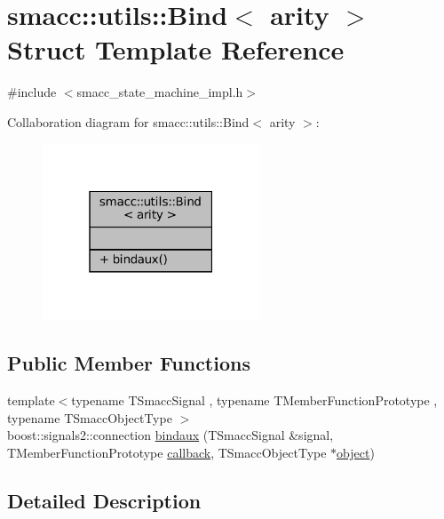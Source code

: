 \hypertarget{structsmacc_1_1utils_1_1Bind}{}\section{smacc\+:\+:utils\+:\+:Bind$<$ arity $>$ Struct Template Reference}
\label{structsmacc_1_1utils_1_1Bind}


{\ttfamily \#include $<$smacc\+\_\+state\+\_\+machine\+\_\+impl.\+h$>$}



Collaboration diagram for smacc\+:\+:utils\+:\+:Bind$<$ arity $>$\+:
\nopagebreak
\begin{figure}[H]
\begin{center}
\leavevmode
\includegraphics[width=183pt]{structsmacc_1_1utils_1_1Bind__coll__graph}
\end{center}
\end{figure}
\subsection*{Public Member Functions}
\begin{DoxyCompactItemize}
\item 
{\footnotesize template$<$typename T\+Smacc\+Signal , typename T\+Member\+Function\+Prototype , typename T\+Smacc\+Object\+Type $>$ }\\boost\+::signals2\+::connection \hyperlink{structsmacc_1_1utils_1_1Bind_aa0f4ba76fbd5fdb865df51b61d4269f3}{bindaux} (T\+Smacc\+Signal \&signal, T\+Member\+Function\+Prototype \hyperlink{3_2servers_2opencv__perception__node_2opencv__perception__node_8cpp_a050e697bd654facce10ea3f6549669b3}{callback}, T\+Smacc\+Object\+Type $\ast$\hyperlink{classobject}{object})
\end{DoxyCompactItemize}


\subsection{Detailed Description}
